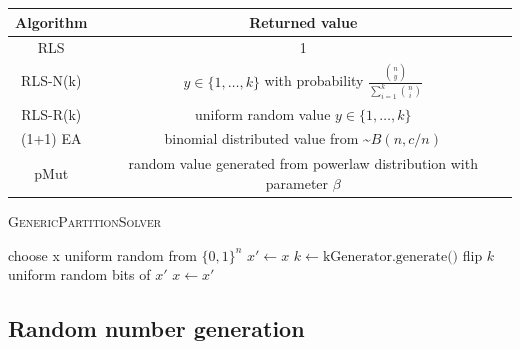 \begin{tabular}[h]{c c}
      Algorithm & Returned value                                                                          \\
      \hline
      RLS       & 1                                                                                       \\
      RLS-N(k)  & $y \in \{1,\dots,k\}$ with probability $\frac{\binom{n}{y}}{\sum_{i=1}^k \binom{n}{i}}$ \\
      RLS-R(k)  & uniform random value $y \in \{1,\dots,k\}$                                              \\
      (1+1) EA  & binomial distributed value from \textasciitilde$B(n,c/n)$                               \\
      pMut      & random value generated from powerlaw distribution with parameter $\beta$                \\
\end{tabular}



\begin{algorithm}[bt]
      \caption{\textsc{GenericPartitionSolver}}\label{alg:genericPartition}

      \DontPrintSemicolon %

      \BlankLine
      choose x uniform random from ${\{0,1\}}^n$\;
      {
      $x' \leftarrow x$\;
      $k \leftarrow \text{kGenerator.generate()}$\;
      flip $k$ uniform random bits of $x'$\;
      {
      {
            $x \leftarrow x'$\;
      }
      }
      }
\end{algorithm}

\subsection{Random number generation}

